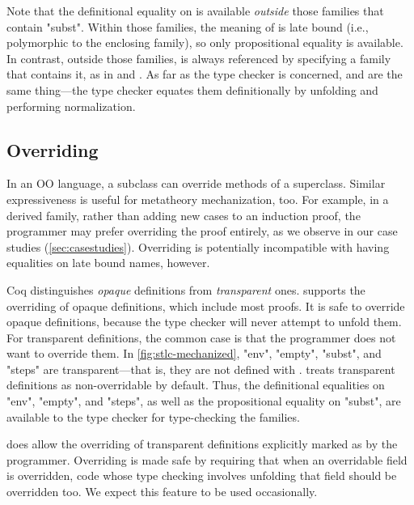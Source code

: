 Note that the definitional equality on  is available
\emph{outside} those families that contain "subst".
Within those families, the meaning of  is late bound
(i.e., polymorphic to the enclosing family), so only
propositional equality is available.
In contrast, outside those families,  is always referenced
by specifying a family that contains it, %
as in  and .
As far as the type checker is concerned,  and
 are the same thing---the type checker
equates them definitionally by unfolding  and
performing normalization.


\subsection{Overriding}
\label{sec:override}

In an OO language, a subclass can override methods of a superclass.
Similar expressiveness is useful for metatheory mechanization, too.
%
For example, in a derived family, rather than adding new cases to an
induction proof, the programmer may prefer overriding the proof
entirely, as we observe in our case studies (\cref{sec:casestudies}).
%
Overriding is potentially incompatible with having equalities on late bound names, however.

Coq distinguishes \emph{opaque} definitions from \emph{transparent} ones.
\Lang supports the overriding of opaque definitions, which
include most proofs.
It is safe to override opaque definitions, because the type checker will
never attempt to unfold them.
For transparent definitions, the common case is that the programmer does
not want to override them.
In \cref{fig:stlc-mechanized}, "env", "empty", "subst", and "steps" are
transparent---that is, they are not defined with .
\Lang treats transparent definitions as non-overridable by default.
Thus, the definitional equalities on "env", "empty", and "steps",
as well as the propositional equality on "subst", are available to the
type checker for type-checking the families.

\Lang does allow the overriding of transparent definitions
explicitly marked as  by the programmer.
Overriding is made safe by requiring that when an overridable field is
overridden, code whose type checking involves unfolding that field
should be overridden too.
We expect this feature to be used occasionally.


